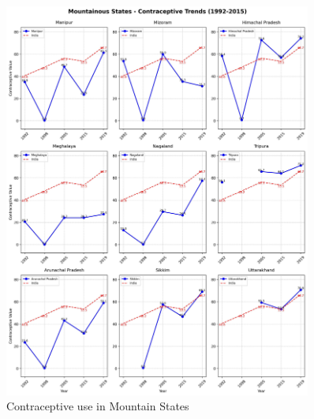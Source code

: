 \begin{figure}[H]
    \centering
    \includegraphics[width=0.9\textwidth]{figures/nfhs/mountainous_states_contraceptive_subplots.pdf}
    \caption{Contraceptive use in Mountain States}
    \label{fig:nfhs_mountain_contraceptive}
\end{figure}

